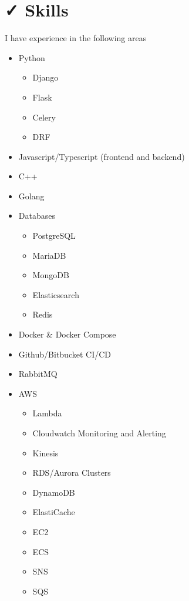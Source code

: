 \documentclass{resume}
\begin{document}
\section{{\faCheck} Skills}
I have experience in the following areas \\
\bigskip
\begin{minipage}[t]{0.3\textwidth}
  \begin{itemize}
    \item Python
    \begin{itemize}
      \item Django
      \item Flask
      \item Celery
      \item DRF
    \end{itemize}
    \item Javascript/Typescript (frontend and backend)
    \item C++
    \item Golang
  \end{itemize}
\end{minipage}
\begin{minipage}[t]{0.3\textwidth}
  \begin{itemize}
    \item Databases
    \begin{itemize}
      \item PostgreSQL
      \item MariaDB
      \item MongoDB
      \item Elasticsearch
      \item Redis
    \end{itemize}
    \item Docker \& Docker Compose
    \item Github/Bitbucket CI/CD
    \item RabbitMQ
  \end{itemize}
\end{minipage}
\begin{minipage}[t]{0.3\textwidth}
  \begin{itemize}
    \item AWS
    \begin{itemize}
      \item Lambda
      \item Cloudwatch Monitoring and Alerting
      \item Kinesis
      \item RDS/Aurora Clusters
      \item DynamoDB
      \item ElastiCache
      \item EC2
      \item ECS
      \item SNS
      \item SQS
    \end{itemize}
  \end{itemize}
\end{minipage}
\end{document}
